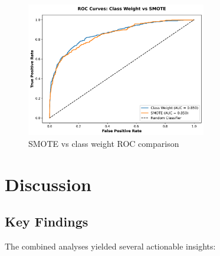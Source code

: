 \documentclass[12pt]{article}
\begin{document}
\begin{figure}[H]
\centering
\includegraphics[width=0.7\textwidth]{img/25_smote_roc_comparison.png}
\caption{SMOTE vs class weight ROC comparison}
\label{fig:smote_roc}
\end{figure}

\section{Discussion}
\subsection{Key Findings}
The combined analyses yielded several actionable insights:
\end{document}
